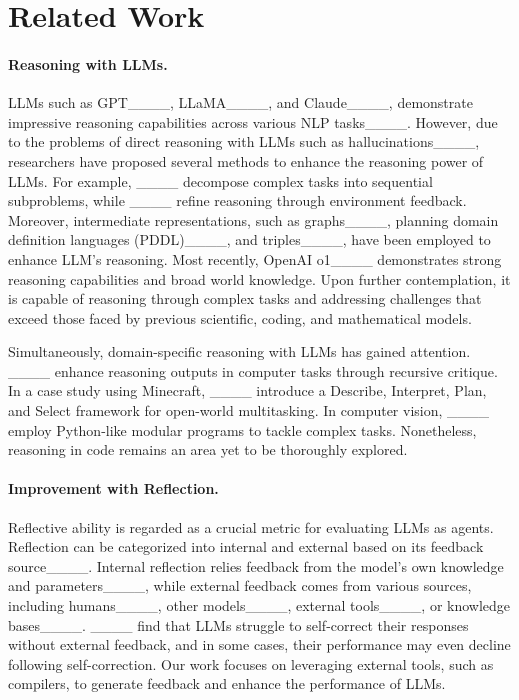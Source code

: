 \section{Related Work}
\paragraph{Reasoning with LLMs.}
LLMs such as GPT____, LLaMA____, and Claude____, demonstrate impressive reasoning capabilities across various NLP tasks____. However, due to the problems of direct reasoning with LLMs such as hallucinations____, researchers have proposed several methods to enhance the reasoning power of LLMs. For example, 
____ decompose complex tasks into sequential subproblems, while %
____ refine reasoning through environment feedback. Moreover, intermediate representations, such as graphs____, planning domain definition languages (PDDL)____, and triples____, have been employed to enhance LLM's reasoning.
Most recently, OpenAI o1____ demonstrates strong reasoning capabilities and broad world knowledge. Upon further contemplation, it is capable of reasoning through complex tasks and addressing challenges that exceed those faced by previous scientific, coding, and mathematical models.

Simultaneously, domain-specific reasoning with LLMs has gained attention. ____ enhance reasoning outputs in computer tasks through recursive critique. In a case study using Minecraft, ____ introduce a Describe, Interpret, Plan, and Select framework for open-world multitasking. In computer vision, ____ employ Python-like modular programs to tackle complex tasks. Nonetheless, reasoning in code remains an area yet to be thoroughly explored.

\paragraph{Improvement with Reflection.} Reflective ability is regarded as a crucial metric for evaluating LLMs as agents. Reflection can be categorized into internal and external based on its feedback source____. Internal reflection relies feedback from the model's own knowledge and parameters____, while external feedback comes from various sources, including humans____, other models____, external tools____, or knowledge bases____.
____ find that LLMs struggle to self-correct their responses without external feedback, and in some cases, their performance may even decline following self-correction. Our work focuses on leveraging external tools, such as compilers, to generate feedback and enhance the performance of LLMs.